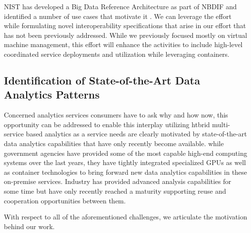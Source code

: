 NIST has developed a Big Data Reference Architecture as part of
NBDIF\cite{nist-v6} and identified a number of use cases that motivate
it \cite{nist-v3}. We can leverage the effort
~\cite{nist-v1,nist-v2,nist-v3,nist-v4,nist-v5,nist-v6,nist-v7,nist-v8,nist-v9}
while formulating novel interoperability specifications that arise in
our effort that has not been previously addressed. While we previously focused
mostly on virtual machine management, this effort will enhance the
activities to include high-level coordinated service deployments and
utilization while leveraging containers.

\subsection{Identification of State-of-the-Art Data Analytics Patterns}

Concerned analytics services consumers have to ask why and how now,
this opportunity can be addressed to enable this interplay utilizing
htbrid multi-service based analytics as a service needs are clearly
motivated by state-of-the-art data analytics capabilities that have
only recently become available.  while government agencies have
provided some of the most capable high-end computing systems over the
last years, they have tightly integrated specialized GPUs as well as
container technologies to bring forward new data analytics
capabilities in these on-premise services. Industry has provided
advanced analysis capabilities for some time but have only recently
reached a maturity supporting reuse and cooperation opportunities
between them.

With respect to all of the aforementioned challenges, we articulate 
the motivation behind our work. 


